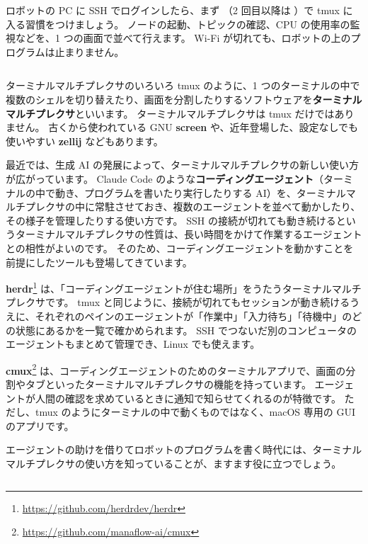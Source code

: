\begin{point}
  ロボットの PC に SSH でログインしたら、まず （2 回目以降は ）で tmux に入る習慣をつけましょう。
  ノードの起動、トピックの確認、CPU の使用率の監視などを、1 つの画面で並べて行えます。
  Wi-Fi が切れても、ロボットの上のプログラムは止まりません。
\end{point}

\begin{column}{ターミナルマルチプレクサのいろいろ}
  tmux のように、1 つのターミナルの中で複数のシェルを切り替えたり、画面を分割したりするソフトウェアを\textbf{ターミナルマルチプレクサ}といいます。
  ターミナルマルチプレクサは tmux だけではありません。
  古くから使われている GNU \textbf{screen} や、近年登場した、設定なしでも使いやすい \textbf{zellij} などもあります。

  最近では、生成 AI の発展によって、ターミナルマルチプレクサの新しい使い方が広がっています。
  Claude Code のような\textbf{コーディングエージェント}（ターミナルの中で動き、プログラムを書いたり実行したりする AI）を、ターミナルマルチプレクサの中に常駐させておき、複数のエージェントを並べて動かしたり、その様子を管理したりする使い方です。
  SSH の接続が切れても動き続けるというターミナルマルチプレクサの性質は、長い時間をかけて作業するエージェントとの相性がよいのです。
  そのため、コーディングエージェントを動かすことを前提にしたツールも登場してきています。

  \textbf{herdr}\footnote{\url{https://github.com/herdrdev/herdr}} は、「コーディングエージェントが住む場所」をうたうターミナルマルチプレクサです。
  tmux と同じように、接続が切れてもセッションが動き続けるうえに、それぞれのペインのエージェントが「作業中」「入力待ち」「待機中」のどの状態にあるかを一覧で確かめられます。
  SSH でつないだ別のコンピュータのエージェントもまとめて管理でき、Linux でも使えます。

  \textbf{cmux}\footnote{\url{https://github.com/manaflow-ai/cmux}} は、コーディングエージェントのためのターミナルアプリで、画面の分割やタブといったターミナルマルチプレクサの機能を持っています。
  エージェントが人間の確認を求めているときに通知で知らせてくれるのが特徴です。
  ただし、tmux のようにターミナルの中で動くものではなく、macOS 専用の GUI のアプリです。

  エージェントの助けを借りてロボットのプログラムを書く時代には、ターミナルマルチプレクサの使い方を知っていることが、ますます役に立つでしょう。
\end{column}

